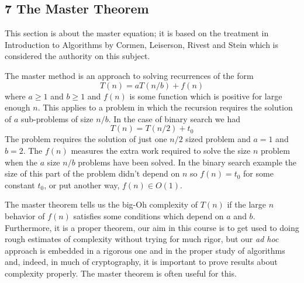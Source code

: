 \documentclass[11pt,a4paper]{scrartcl}
\begin{document}
\subsection*{7 The Master Theorem}

This section is about the master equation; it is based on the
treatment in Introduction to Algorithms by Cormen, Leiserson, Rivest
and Stein which is considered the authority on this subject.

The master method is an approach to solving recurrences of the form
\begin{equation}
T(n)=aT(n/b)+f(n)
\end{equation}
where $a\ge 1$ and $b\ge 1$ and $f(n)$ is some function which is
positive for large enough $n$. This applies to a problem in which the
recursion requires the solution of $a$ sub-problems of size $n/b$. In
the case of binary search we had
\begin{equation}
T(n)=T(n/2)+t_0
\end{equation}
The problem requires the solution of just one $n/2$ sized problem and
$a=1$ and $b=2$. The $f(n)$ measures the extra work required to solve
the size $n$ problem when the $a$ size $n/b$ problems have been
solved. In the binary search example the size of this part of the
problem didn't depend on $n$ so $f(n)=t_0$ for some constant $t_0$, or put
another way, $f(n)\in O(1)$.

The master theorem tells us the big-Oh complexity of $T(n)$ if the
large $n$ behavior of $f(n)$ satisfies some conditions which depend on
$a$ and $b$. Furthermore, it is a proper theorem, our aim in this
course is to get used to doing rough estimates of complexity without
trying for much rigor, but our \textsl{ad hoc} approach is embedded in a
rigorous one and in the proper study of algorithms and, indeed, in
much of cryptography, it is important to prove results about complexity
properly. The master theorem is often useful for this.
\end{document}
